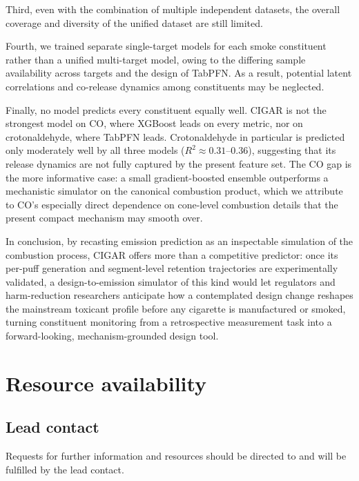 ﻿\documentclass[a4paper,fleqn]{cas-sc}
\begin{document}
Third, even with the combination of multiple independent datasets, the overall coverage and diversity of the unified dataset are still limited.

Fourth, we trained separate single-target models for each smoke constituent rather than a unified multi-target model, owing to the differing sample availability across targets and the design of TabPFN. As a result, potential latent correlations and co-release dynamics among constituents may be neglected.

Finally, no model predicts every constituent equally well. CIGAR is not the strongest model on CO, where XGBoost leads on every metric, nor on crotonaldehyde, where TabPFN leads. Crotonaldehyde in particular is predicted only moderately well by all three models ($R^2 \approx 0.31$--$0.36$), suggesting that its release dynamics are not fully captured by the present feature set. The CO gap is the more informative case: a small gradient-boosted ensemble outperforms a mechanistic simulator on the canonical combustion product, which we attribute to CO's especially direct dependence on cone-level combustion details that the present compact mechanism may smooth over.

In conclusion, by recasting emission prediction as an inspectable simulation of the combustion process, CIGAR offers more than a competitive predictor: once its per-puff generation and segment-level retention trajectories are experimentally validated, a design-to-emission simulator of this kind would let regulators and harm-reduction researchers anticipate how a contemplated design change reshapes the mainstream toxicant profile before any cigarette is manufactured or smoked, turning constituent monitoring from a retrospective measurement task into a forward-looking, mechanism-grounded design tool.



\section{Resource availability}

\subsection{Lead contact}

Requests for further information and resources should be directed to and will be fulfilled by the lead contact.
\end{document}
